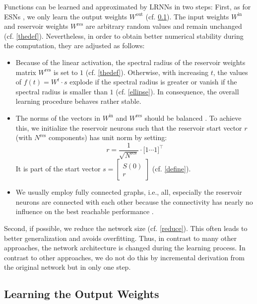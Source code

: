 \documentclass[preprint,12pt,times,authoryear]{elsarticle}%
\theoremstyle{definition}
\begin{document}
Functions can be learned and approximated by LRNNs in two steps: First, as for
ESNs \citep{JH04}, we only learn the output weights $W^\mathrm{out}$ (cf.
\cref{output}). The input weights
$W^\mathrm{in}$ and reservoir weights $W^\mathrm{res}$ are arbitrary random
values and remain unchanged (cf. \cref{thedef}). Nevertheless, in order to
obtain better numerical stability during the computation, they are adjusted as
follows:
\begin{itemize}
  \item Because of the linear activation, the spectral radius of the reservoir
	weights matrix $W^\mathrm{res}$ is set to $1$ (cf. \cref{thedef}).
	Otherwise, with increasing $t$, the values of $f(t) = W^t \cdot s$
	explode if the spectral radius is greater or vanish if the spectral
	radius is smaller than $1$ (cf. \cref{ellipse}). In consequence, the
	overall learning procedure behaves rather stable.
  \item The norms of the vectors in $W^\mathrm{in}$ and $W^\mathrm{res}$ should
	be balanced \citep{KLB12}. To achieve this, we initialize the reservoir
	neurons such that the reservoir start vector $r$ (with $N^\mathrm{res}$
	components) has unit norm by
	setting:
	\[ r = \frac{1}{\sqrt{N^\mathrm{res}}} \cdot \big[ 1 \cdots 1 \big]^\top \]
	It is part of the start vector $s = \left[ \begin{array}{c} S(0) \\ r
	\end{array} \right]$ (cf. \cref{define}).
  \item We usually employ fully connected graphs, i.e., all, especially the
	reservoir neurons are connected with each other because the
	connectivity has nearly no influence on the best reachable performance
	\citep{KLB12}.
\end{itemize}
Second, if possible, we reduce the network size (cf. \cref{reduce}).
This often leads to better generalization and avoids overfitting. Thus, in
contrast to many other approaches, the network architecture is changed during
the learning process. In contrast to other approaches, we do not do this by
incremental derivation from the original network but in only one step.

\subsection{Learning the Output Weights}\label{output}
\end{document}
